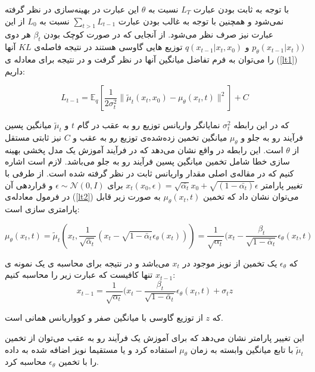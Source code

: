 با توجه به ثابت بودن عبارت $L_T$ نسبت به $\theta$ این عبارت در بهینه‌سازی در نظر گرفته نمی‌شود و همچنین با توجه به غالب بودن عبارت $\sum_{t>1} L_{t-1}$ نسبت به $L_0$  از این عبارت نیز صرف نظر می‌شود\cite{ho2020denoising}. از آنجایی که در صورت کوچک بودن $\beta_t$ هر دوی $ p_\theta(x_{t-1}|x_t))$ و $ q(x_{t-1}|x_t, x_0)$ توزیع هایی گاوسی هستند در نتیجه فاصله‌ی  $KL$ آنها را می‌توان به فرم تفاضل میانگین آنها در نظر گرفت و در نتیجه برای معادله ی (\ref{lt1})  داریم:

\begin{equation}
\label{lt2}
L_{t-1} = \mathbb{E}_q \left[ \frac{1}{2\sigma_t^2} \|\tilde{\mu}_t(x_t, x_0) - \mu_\theta(x_t, t)\|^2 \right] + C
\end{equation} 

که در این رابطه $\sigma^2_t$ نمایانگر واریانس توزیع رو به عقب در گام $t$ و $\tilde{\mu}_t$ میانگین پسین فرآیند رو به جلو و  $\mu_\theta$ میانگین تخمین زده‌شده‌ی توزیع رو به عقب و $C$ نیز ثابتی مستقل از $\theta$ است. این رابطه در واقع نشان می‌دهد که در فرآیند آموزش یک مدل پخشی بهینه سازی خطا شامل تخمین میانگین پسین فرآیند رو به جلو می‌باشد. لازم است اشاره کنیم که در مقاله‌ی اصلی\cite{ho2020denoising} مقدار واریانس ثابت در نظر گرفته شده است. از طرفی با تغییر پارامتر $ x_t(x_0, \epsilon) = \sqrt{\bar{\alpha_t}}x_0 + \sqrt{(1 - \bar{\alpha_t})}\epsilon$ برای $ \epsilon \sim \mathcal{N}(0, I)$ و قراردهی آن در فرمول معادله‌ی (\ref{lt2}) می‌توان نشان داد که تخمین $\mu_\theta(x_t, t)$ به صورت زیر قابل پارامتری سازی است:

\begin{equation}
\mu_\theta(x_t, t) = \tilde{\mu}_t \left(x_t, \frac{1}{\sqrt{\bar\alpha_t}}\left(x_{t} - \sqrt{1-\bar\alpha_t}\epsilon_\theta(x_t)\right)\right) = \frac{1}{\sqrt{\alpha_t}} (x_t - \frac{\beta_t}{\sqrt{1 - \bar\alpha_t}}\epsilon_\theta(x_t, t)
\end{equation} 

که $\epsilon_\theta$ یک تخمین از نویز موجود در $x_t$ می‌باشد و در نتیجه برای محاسبه ی یک نمونه ی $x_{t-1}$ تنها کافیست که عبارت زیر را محاسبه کنیم:
\begin{equation}
\label{sample}
x_{t-1} = \frac{1}{\sqrt{\alpha_t}} (x_t - \frac{\beta_t}{\sqrt{1 - \bar\alpha_t}}\epsilon_\theta(x_t, t) + \sigma_tz
\end{equation}

که $z$ از توزیع گاوسی با میانگین صفر و کوواریانس همانی است.

این تغییر پارامتر نشان می‌دهد که برای آموزش یک فرآیند رو به عقب می‌توان از تخمین $\tilde{\mu}_t$ با تابع میانگین وابسته به زمان $\mu_\theta$ استفاده کرد و یا مستقیما نویز اضافه شده به داده را با تخمین $\epsilon_{\theta}$ محاسبه کرد. 
